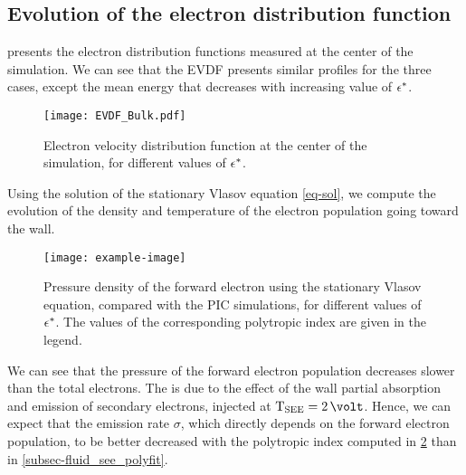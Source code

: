 \subsection{Evolution of the electron distribution function} \label{subsec-EVDF_see_polyfit}

 presents the electron distribution functions measured at the center of the simulation. 
We can see that the \ac{EVDF} presents similar profiles for the three cases, except the mean energy that decreases with increasing value of $\epsilon^{*}$.



\begin{figure}[hbtp]
  \centering
  \texttt{[image: EVDF\_Bulk.pdf]}
  \caption{Electron velocity distribution function at the center of the simulation, for different values of $\epsilon^{*}$.}
  \label{fig-evdf_epsstar}
\end{figure}

Using the solution of the stationary Vlasov equation \cref{eq-sol}, we compute the evolution of the density and temperature of the electron population going toward the wall.

\begin{figure}[hbtp]
  \centering
  \texttt{[image: example-image]}
  \caption{Pressure density of the forward electron using the stationary Vlasov equation, compared with the \ac{PIC} simulations, for different values of $\epsilon^{*}$. The values of the corresponding polytropic index are given in the legend.}
  \label{fig-evdf_polyfit}
\end{figure}

We can see that the pressure of the forward electron population decreases slower than the total electrons.
The is due to the effect of the wall partial absorption and emission of secondary electrons, injected at $\Tsee=2\,\volt$.
Hence, we can expect that the emission rate $\sigma$, which directly depends on the forward electron population, to be better decreased with the polytropic index computed in \cref{fig-evdf_polyfit} than in \cref{subsec-fluid_see_polyfit}.

